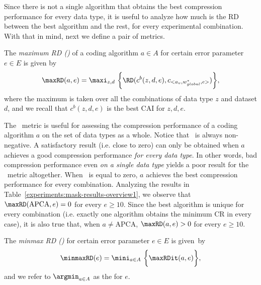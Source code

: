 Since there is not a single algorithm that obtains the best compression performance for every data type, it is useful to analyze how much is the RD between the best algorithm and the rest, for every experimental combination. With that in mind, next we define a pair of metrics.


\clearpage


\begin{defcion}
\label{eq:maxRD}
The \textit{maximum RD (\maxRDit)} of a coding algorithm $a\in A$ for certain error parameter $e\in E$ is given by
\vspace{-4pt}
\begin{equation}
\maxRD(a, e) = \maxi_{z, d} \ \biggl\{ \RD(c^{b}(z,d,e), c_{<a_v, w_{global}^{*}, e>}) \biggr\},
\end{equation}
where the maximum is taken over all the combinations of data type $z$ and dataset $d$, and we recall that $c^{b}(z,d,e)$ is the best CAI for $z, d, e$.
\end{defcion}


The \maxRD\ metric is useful for assessing the compression performance of a coding algorithm $a$ on the set of data types as a whole. Notice that \maxRD\ is always non-negative. A satisfactory result (i.e. close to zero) can only be obtained when $a$ achieves a good compression performance \textit{for every data type}. In other words, bad compression performance even \textit{on a single data type} yields a poor result for the \maxRD\ metric altogether. When \maxRD\ is equal to zero, $a$ achieves the best compression performance for every combination. Analyzing the results in Table~\ref{experiments:mask-results-overview1}, we observe that $\text{\maxRD}(\text{APCA}, e)=0$ for every $e \geq 10$. Since the best algorithm is unique for every combination (i.e. exactly one algorithm obtains the minimum CR in every case), it is also true that, when $a \neq \text{APCA}$, $\text{\maxRD}(a, e)>0$ for every $e \geq 10$.


\vspace{+10pt}
\begin{defcion}
\label{eq:minmaxRD}
The \textit{minmax RD (\minmaxRDit)} for certain error parameter $e\in E$ is given~by
\vspace{-4pt}
\begin{equation}
\minmaxRD(e) = \mini_{a \in A} \ \biggl\{ \maxRDit(a, e) \biggr\},
\end{equation}
and we refer to $\argmin_{a \in A}$ as the \textit{\minmaxca} for $e$.
\end{defcion}


